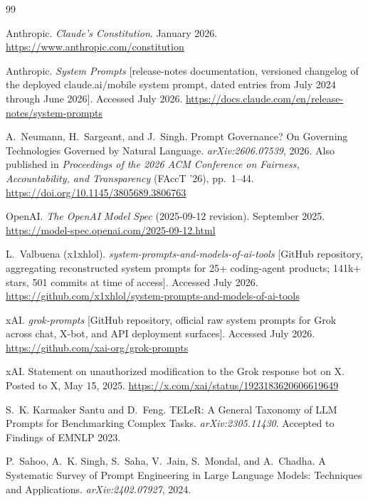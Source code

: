 \documentclass[11pt]{article}
\begin{document}

\begin{thebibliography}{99}

Anthropic. \emph{Claude's Constitution}. January 2026.
\url{https://www.anthropic.com/constitution}

Anthropic. \emph{System Prompts} [release-notes documentation, versioned
changelog of the deployed claude.ai/mobile system prompt, dated entries
from July 2024 through June 2026]. Accessed July 2026.
\url{https://docs.claude.com/en/release-notes/system-prompts}

A.~Neumann, H.~Sargeant, and J.~Singh. Prompt Governance? On Governing
Technologies Governed by Natural Language. \emph{arXiv:2606.07539}, 2026.
Also published in \emph{Proceedings of the 2026 ACM Conference on
Fairness, Accountability, and Transparency} (FAccT '26), pp.\ 1--44.
\url{https://doi.org/10.1145/3805689.3806763}

OpenAI. \emph{The OpenAI Model Spec} (2025-09-12 revision). September 2025.
\url{https://model-spec.openai.com/2025-09-12.html}

L.~Valbuena (x1xhlol). \emph{system-prompts-and-models-of-ai-tools}
[GitHub repository, aggregating reconstructed system prompts for 25+
coding-agent products; 141k+ stars, 501 commits at time of access].
Accessed July 2026.
\url{https://github.com/x1xhlol/system-prompts-and-models-of-ai-tools}

xAI. \emph{grok-prompts} [GitHub repository, official raw system prompts
for Grok across chat, X-bot, and API deployment surfaces]. Accessed July 2026.
\url{https://github.com/xai-org/grok-prompts}

xAI. Statement on unauthorized modification to the Grok response bot on X.
Posted to X, May 15, 2025.
\url{https://x.com/xai/status/1923183620606619649}

S.~K. Karmaker Santu and D.~Feng. TELeR: A General Taxonomy of LLM Prompts
for Benchmarking Complex Tasks. \emph{arXiv:2305.11430}. Accepted to
Findings of EMNLP 2023.

P.~Sahoo, A.~K. Singh, S.~Saha, V.~Jain, S.~Mondal, and A.~Chadha.
A Systematic Survey of Prompt Engineering in Large Language Models:
Techniques and Applications. \emph{arXiv:2402.07927}, 2024.


\end{thebibliography}
\end{document}
